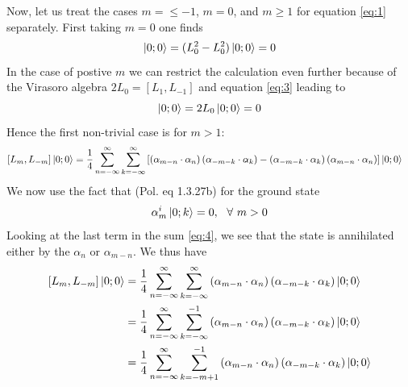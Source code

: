 \documentclass[a4paper,10pt]{article}
\renewcommand\[{\begin{equation*}}
\renewcommand\]{\end{equation*}}
\numberwithin{equation}{section}
\begin{document}
Now, let us treat the cases $m=\leq-1$, $m=0$, and $m\geq1$ for equation \eqref{eq:1} separately. First taking $m=0$ one finds
\begin{equation}
     [L_0, L_{0}]\ket{0;0}=(L_0^2-L_{0}^2)\ket{0;0}=0
\end{equation}
In the case of postive $m$ we can restrict the calculation even further because of the Virasoro algebra $2L_0=[L_1,L_{-1}]$ and equation \eqref{eq:3} leading to
\begin{equation}
     [L_{1}, L_{-1}]\ket{0;0}=2L_0\ket{0;0}=0
\end{equation}
Hence the first non-trivial case is for $m>1$:
\begin{equation} \label{eq:4}
    \begin{aligned}
       [L_{m}, L_{-m}]\ket{0;0}&=\frac{1}{4}\sum^{\infty}_{n=-\infty}\sum_{k=-\infty}^{\infty}\left[
       \left(
       \alpha_{m-n}\cdot \alpha_n
       \right)
       \left(
       \alpha_{-m-k}\cdot \alpha_k
       \right)
       -
       \left(
       \alpha_{-m-k}\cdot \alpha_k
       \right)
       \left(
       \alpha_{m-n}\cdot \alpha_n
       \right)
       \right]\ket{0;0}
    \end{aligned}
\end{equation}
We now use the fact that (Pol. eq 1.3.27b) for the ground state
\begin{equation}
    \alpha_m^i\ket{0;k}=0,~~\forall ~m>0
\end{equation}
Looking at the last term in the sum \eqref{eq:4}, we see that the state is annihilated either by the $\alpha_n$ or $\alpha_{m-n}$. We thus have
\begin{equation} \label{eq:4}
    \begin{aligned}
       [L_{m}, L_{-m}]\ket{0;0}&=\frac{1}{4}\sum^{\infty}_{n=-\infty}\sum_{k=-\infty}^{\infty}
       \left(
       \alpha_{m-n}\cdot \alpha_n
       \right)
       \left(
       \alpha_{-m-k}\cdot \alpha_k
       \right)
       \ket{0;0}\\
       &=\frac{1}{4}\sum^{\infty}_{n=-\infty}\sum_{k=-\infty}^{-1}
       \left(
       \alpha_{m-n}\cdot \alpha_n
       \right)
       \left(
       \alpha_{-m-k}\cdot \alpha_k
       \right)
       \ket{0;0}\\
       &=\frac{1}{4}\sum^{\infty}_{n=-\infty}\sum_{k=-m+1}^{-1}
       \left(
       \alpha_{m-n}\cdot \alpha_n
       \right)
       \left(
       \alpha_{-m-k}\cdot \alpha_k
       \right)
       \ket{0;0}
    \end{aligned}
\end{equation}
\end{document}
